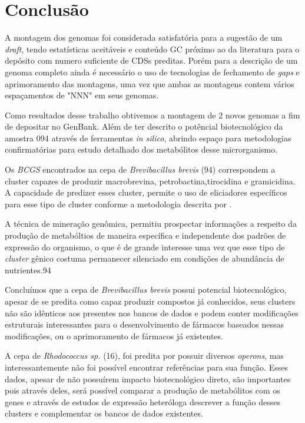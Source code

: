 \chapter{Conclusão}
\label{conclusao}


A montagem dos genomas foi considerada satisfatória para a sugestão de um \textit{draft}, tendo
estatísticas aceitáveis e conteúdo GC próximo ao da literatura para o depósito com numero suficiente de CDSs preditas. Porém para a descrição
de um genoma completo ainda é necessário o uso de tecnologias de fechamento de \textit{gaps} e aprimoramento
das montagens, uma vez que ambas as montagens contem vários espaçamentos de "NNN" em seus genomas.

Como resultados desse trabalho obtivemos a montagem de 2 novos genomas a fim de depositar no GenBank. Além de ter descrito o potêncial biotecnológico da amostra 094
através de ferramentas \textit{in silico}, abrindo espaço para metodologias confirmatórias para
estudo detalhado dos metabólitos desse microrganismo.

Os \textit{BCGS} encontrados na cepa de \textit{Brevibacillus brevis} (94) correspondem a cluster capazes de produzir macrobrevina,
petrobactina,tirocidina e gramicidina. A capacidade de predizer esses cluster, permite o
uso de eliciadores específicos para esse tipo de cluster conforme a metodologia descrita por .

A técnica de mineração genômica, permitiu prospectar informações a respeito
da produção de metabóltios de maneira específica e independente dos padrões de expressão 
do organismo, o que é de grande interesse uma vez que esse tipo de \textit{cluster} gênico costuma permanecer
silenciado em condições de abundância de nutrientes.94

Concluímos que a cepa de \textit{Brevibacillus brevis } possui potencial biotecnológico, apesar de se predita 
como capaz produzir compostos já conhecidos, seus clusters não são idênticos aos presentes nos bancos 
de dados e podem conter modificações estruturais interessantes para o desenvolvimento
de fármacos baseados nessas modificações, ou o aprimoramento de fármacos já existentes.

A cepa de \textit{Rhodococcus sp.} (16), foi predita por possuir diversos \textit{operons}, mas interessantemente
não foi possível encontrar referências para sua função. Esses dados, apesar de não possuírem
impacto biotecnológico direto, são importantes pois através deles, será possível comparar a produção
de metabólitos com os genes e através de estudos de expressão heteróloga descrever a função
desses clusters e complementar os bancos de dados existentes.

